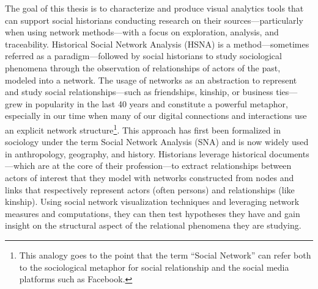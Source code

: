 The goal of this thesis is to characterize and produce visual analytics tools that can support social historians conducting research on their sources---particularly when using network methods---with a focus on exploration, analysis, and traceability.
Historical Social Network Analysis (HSNA) is a method---sometimes referred as a paradigm\cite{whiteNetworkAnalysisEthnographic2005}---followed by social historians to study sociological phenomena through the observation of relationships of actors of the past, modeled into a network.
The usage of networks as an abstraction to represent and study social relationships---such as friendships, kinship, or business ties---grew in popularity in the last 40 years \cite{freemanDevelopmentSocialNetwork2004, tabassumSocialNetworkAnalysis2018} and constitute a powerful metaphor, especially in our time when many of our digital connections and interactions use an explicit network structure\footnote{This analogy goes to the point that the term ``Social Network'' can refer both to the sociological metaphor for social relationship and the social media platforms such as Facebook.}.
This approach has first been formalized in sociology under the term Social Network Analysis (SNA)\cite{freemanDevelopmentSocialNetwork2004} and is now widely used in anthropology, geography, and history\cite{kerschbaumerPowerNetworksProspects2015}.
Historians leverage historical documents---which are at the core of their profession\cite{langloisIntroductionAuxEtudes2014}---to extract relationships between actors of interest that they model with networks constructed from nodes and links that respectively represent actors (often persons) and relationships (like kinship).
Using social network visualization techniques and leveraging network measures and computations, they can then test hypotheses they have and gain insight on the structural aspect of the relational phenomena they are studying\cite{wetherellHistoricalSocialNetwork1998, kerschbaumerPowerNetworksProspects2015}.
